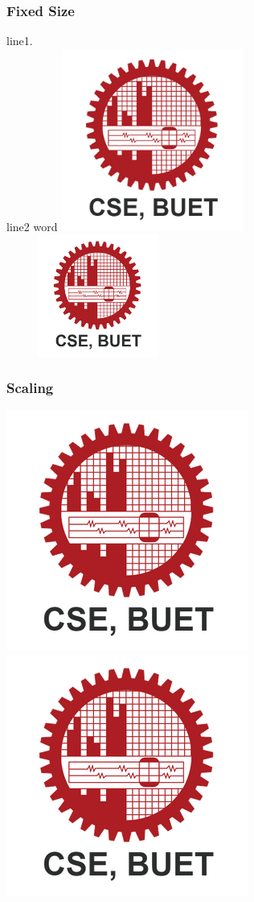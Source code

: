 \documentclass[twocolumn]{article}
\begin{document}
\subsubsection{Fixed Size}
line1. \\
line2
word
\includegraphics[width=6cm]{Images/CSE_BUET.png}
\includegraphics[width=6cm, height=4cm]{Images/CSE_BUET.png}
\pagebreak


\subsubsection{Scaling}
\includegraphics[scale=.2]{Images/CSE_BUET.png}
\includegraphics[scale=1.2]{Images/CSE_BUET.png}
\end{document}
